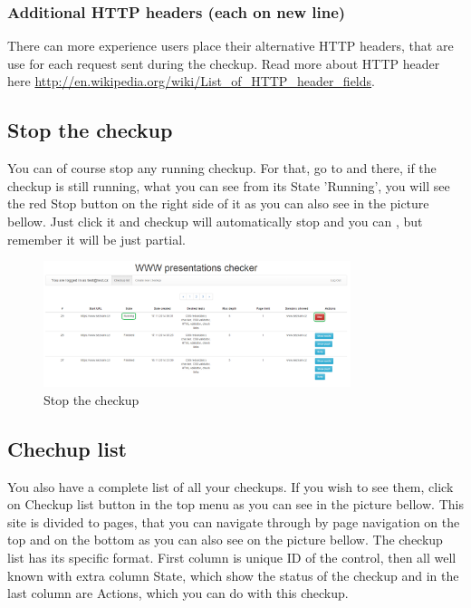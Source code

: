 \documentclass[12pt,a4paper]{article}
\begin{document}
\subsubsection{Additional HTTP headers (each on new line)}
There can more experience users place their alternative HTTP headers, that are use for each request sent during the checkup. Read more about HTTP header here \url{http://en.wikipedia.org/wiki/List_of_HTTP_header_fields}.

\subsection{Stop the checkup}
You can of course stop any running checkup. For that, go to  and there, if the checkup is still running, what you can see from its State 'Running', you will see the red Stop button on the right side of it as you can also see in the picture bellow. Just click it and checkup will automatically stop and you can , but remember it will be just partial.

\begin{figure}[H]
    \centering
    \includegraphics[width=0.8\textwidth]{pictures/stop.png}
		\caption{Stop the checkup}
		\label{fig:stop}
\end{figure}

\subsection{Chechup list} \label{list}
You also have a complete list of all your checkups. If you wish to see them, click on Checkup list button in the top menu as you can see in the picture bellow. This site is divided to pages, that you can navigate through by page navigation on the top and on the bottom as you can also see on the picture bellow. The checkup list has its specific format. First column is unique ID of the control, then all well known  with extra column State, which show the status of the checkup and in the last column are Actions, which you can do with this checkup.
\end{document}
